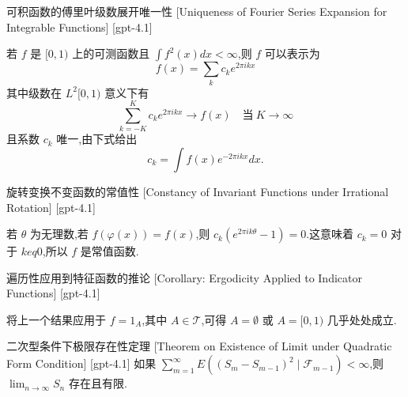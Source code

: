 \documentclass[UTF8]{ctexart}
\begin{document}
    
    
    \begin{thm}
        {可积函数的傅里叶级数展开唯一性}
        [Uniqueness of Fourier Series Expansion for Integrable Functions]
        [gpt-4.1]
        
若 $f$ 是 $[0, 1)$ 上的可测函数且 $\int f^{2}(x) dx < \infty$,则 $f$ 可以表示为
\[
f(x) = \sum_{k} c_{k} e^{2\pi i k x}
\]
其中级数在 $L^{2}[0, 1)$ 意义下有
\[
\sum_{k=-K}^{K} c_{k} e^{2\pi i k x} \to f(x) \quad \text{当} \ K \to \infty
\]
且系数 $c_{k}$ 唯一,由下式给出
\[
c_{k} = \int f(x) e^{-2\pi i k x} dx.
\]

    \end{thm}
    
    
    
    \begin{thm}
        {旋转变换不变函数的常值性}
        [Constancy of Invariant Functions under Irrational Rotation]
        [gpt-4.1]
        
若 $\theta$ 为无理数,若 $f(\varphi(x)) = f(x)$,则 $c_{k}(e^{2\pi i k \theta} - 1) = 0$.这意味着 $c_{k} = 0$ 对于 $k 
eq 0$,所以 $f$ 是常值函数.

    \end{thm}
    
    
    
    \begin{crl}
        {遍历性应用到特征函数的推论}
        [Corollary: Ergodicity Applied to Indicator Functions]
        [gpt-4.1]
        
将上一个结果应用于 $f = 1_{A}$,其中 $A \in \mathcal{T}$,可得 $A = \emptyset$ 或 $A = [0, 1)$ 几乎处处成立.

    \end{crl}
    
    
    
    \begin{thm}
        {二次型条件下极限存在性定理}
        [Theorem on Existence of Limit under Quadratic Form Condition]
        [gpt-4.1]
        如果 $\sum_{m=1}^{\infty} E( ( S_{m} - S_{m-1} )^{2} \mid \mathcal{F}_{m-1} ) < \infty$,则 $\lim_{n \to \infty} S_{n}$ 存在且有限.
    \end{thm}
    
    
    
\end{document}
